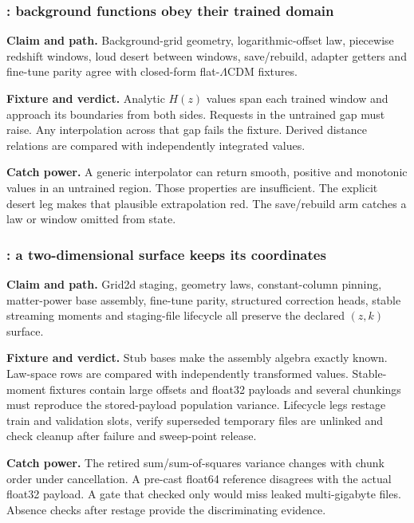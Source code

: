 \subsubsection{: background functions obey their trained domain}

\textbf{Claim and path.}  Background-grid geometry, logarithmic-offset law,
piecewise redshift windows, loud desert between windows, save/rebuild, adapter
getters and fine-tune parity agree with closed-form flat-\(\Lambda\)CDM
fixtures.

\textbf{Fixture and verdict.}  Analytic \(H(z)\) values span each trained
window and approach its boundaries from both sides.  Requests in the
untrained gap must raise.  Any interpolation across that gap fails the
fixture.  Derived distance relations are compared with independently integrated values.

\textbf{Catch power.}  A generic interpolator can return smooth, positive and
monotonic values in an untrained region.  Those properties are insufficient.
The explicit desert leg makes that plausible extrapolation red.  The
save/rebuild arm catches a law or window omitted from state.

\subsubsection{: a two-dimensional surface keeps its coordinates}

\textbf{Claim and path.}  Grid2d staging, geometry laws, constant-column
pinning, matter-power base assembly, fine-tune parity, structured correction
heads, stable streaming moments and staging-file lifecycle all preserve the
declared \((z,k)\) surface.

\textbf{Fixture and verdict.}  Stub bases make the assembly algebra exactly
known.  Law-space rows are compared with independently transformed values.
Stable-moment fixtures contain large offsets and float32 payloads and several
chunkings must reproduce the stored-payload population variance.  Lifecycle
legs restage train and validation slots, verify superseded temporary files are
unlinked and check cleanup after failure and sweep-point release.

\textbf{Catch power.}  The retired sum/sum-of-squares variance changes with
chunk order under cancellation.  A pre-cast float64 reference disagrees with
the actual float32 payload.  A gate that checked only
 would miss leaked multi-gigabyte files.  Absence
checks after restage provide the discriminating evidence.

